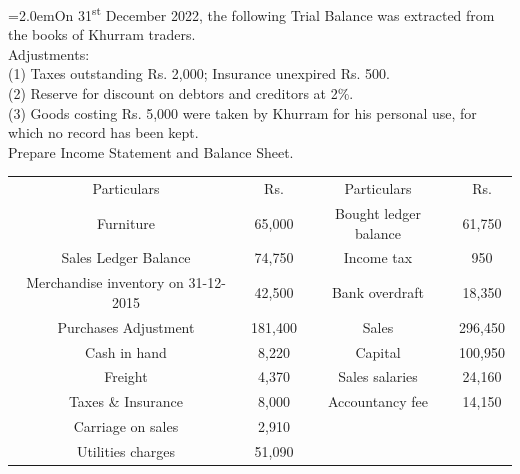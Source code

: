 \documentclass[11pt,a4paper]{article}
\newcommand{\lqn}[2]{\Needspace{6\baselineskip}\par\medskip\noindent\hangindent=2.0em\hangafter=1\makebox[2.0em][l]{\textbf{#1.}}#2\par}
\begin{document}
\lqn{119}{On 31\textsuperscript{st} December 2022, the following Trial Balance was extracted from the books of Khurram traders.\\
Adjustments:\\
(1) Taxes outstanding Rs. 2,000; Insurance unexpired Rs. 500.\\
(2) Reserve for discount on debtors and creditors at 2\%.\\
(3) Goods costing Rs. 5,000 were taken by Khurram for his personal use, for which no record has been kept.\\
Prepare Income Statement and Balance Sheet.\par
\par\smallskip\noindent\hspace*{1.2em}\begin{tabular}{|cccc|}
\hline
Particulars & Rs. & Particulars & Rs. \\
Furniture & 65,000 & Bought ledger balance & 61,750 \\
Sales Ledger Balance & 74,750 & Income tax & 950 \\
Merchandise inventory on 31-12-2015 & 42,500 & Bank overdraft & 18,350 \\
Purchases Adjustment & 181,400 & Sales & 296,450 \\
Cash in hand & 8,220 & Capital & 100,950 \\
Freight & 4,370 & Sales salaries & 24,160 \\
Taxes \& Insurance & 8,000 & Accountancy fee & 14,150 \\
Carriage on sales & 2,910 &  &  \\
Utilities charges & 51,090 &  &  \\
\hline
\end{tabular}\par\smallskip
}
\end{document}
